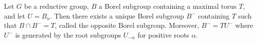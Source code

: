 Let $G$ be a reductive group, $B$ a Borel subgroup containing a maximal torus $T$, and let $U = B_u$. Then there exists a unique Borel subgroup $B^{-}$ containing $T$ such that $B \cap B^{-} = T$, called the opposite Borel subgroup. Moreover, $B^{-} = T U^{-}$ where $U^{-}$ is generated by the root subgroups $U_{-\alpha}$ for positive roots $\alpha$.
